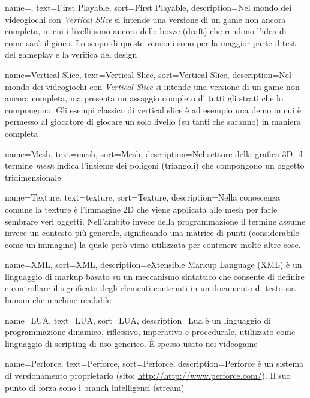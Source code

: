 {
	name=,
	text=First Playable,
	sort=First Playable,
	description={Nel mondo dei videogiochi con \emph{Vertical Slice} si intende una versione di un game non ancora completa, in cui i livelli sono ancora delle bozze (draft) che rendono l'idea di come sarà il gioco. Lo scopo di queste versioni sono per la maggior parte il test del gameplay e la verifica del design}
}

{
	name=Vertical Slice,
	text=Vertical Slice,
	sort=Vertical Slice,
	description={Nel mondo dei videogiochi con \emph{Vertical Slice} si intende una versione di un game non ancora completa, ma presenta un assaggio completo di tutti gli strati che lo compongono. Gli esempi classico di vertical slice è ad esempio una demo in cui è permesso al giocatore di giocare un solo livello (su tanti che saranno) in maniera completa}
}

{
	name=Mesh,
	text=mesh,
	sort=Mesh,
	description={Nel settore della grafica 3D, il termine \emph{mesh} indica l'insieme dei poligoni (triangoli) che compongono un oggetto tridimensionale}
}

{
	name=Texture,
	text=texture,
	sort=Texture,
	description={Nella conoscenza comune la texture è l'immagine 2D che viene applicata alle mesh per farle sembrare veri oggetti. Nell'ambito invece della programmazione il termine assume invece un contesto più generale, significando una matrice di punti (considerabile come un'immagine) la quale però viene utilizzata per contenere molte altre cose.}
}

{
	name=XML,
	sort=XML,
	description={eXtensible Markup Language (XML) è un linguaggio di markup basato su un meccanismo sintattico che consente di definire e controllare il significato degli elementi contenuti in un documento di testo sia human che machine readable}
}

{
	name=LUA,
	text=LUA,
	sort=LUA,
	description={Lua è un linguaggio di programmazione dinamico, riflessivo, imperativo e procedurale, utilizzato come linguaggio di scripting di uso generico. È spesso usato nei videogame}
}

{
	name=Perforce\textsuperscript{\textregistered},
	text=Perforce\textsuperscript{\textregistered},
	sort=Perforce,
	description={Perforce\textsuperscript{\textregistered} è un sistema di versionamento proprietario (sito: \url{http://http://www.perforce.com/}). Il suo punto di forza sono i branch intelligenti (stream)}
}


